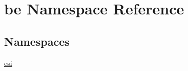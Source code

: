 \hypertarget{namespacebe}{}\section{be Namespace Reference}
\label{namespacebe}
\subsection*{Namespaces}
\begin{DoxyCompactItemize}
\item 
 \hyperlink{namespacebe_1_1esi}{esi}
\end{DoxyCompactItemize}
